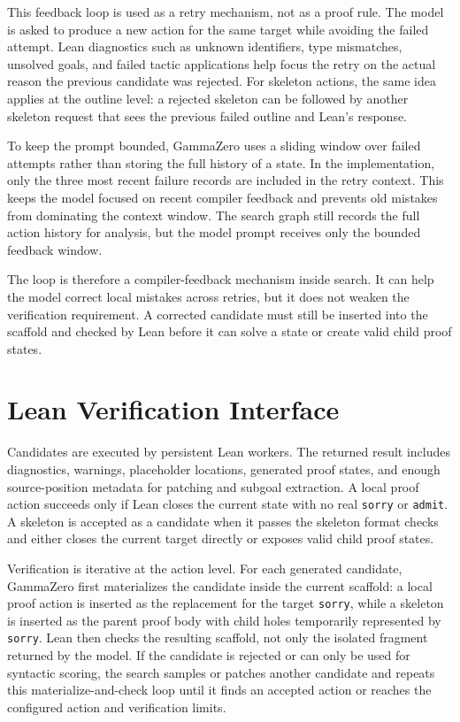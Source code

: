 This feedback loop is used as a retry mechanism, not as a proof rule. The model is asked to produce a
new action for the same target while avoiding the failed attempt. Lean diagnostics such as unknown
identifiers, type mismatches, unsolved goals, and failed tactic applications help focus the retry on the
actual reason the previous candidate was rejected. For skeleton actions, the same idea applies at the
outline level: a rejected skeleton can be followed by another skeleton request that sees the previous
failed outline and Lean's response.

To keep the prompt bounded, GammaZero uses a sliding window over failed attempts rather than storing
the full history of a state. In the implementation, only the three most recent failure records are included
in the retry context. This keeps the model focused on recent compiler feedback and prevents old
mistakes from dominating the context window. The search graph still records the full action history for
analysis, but the model prompt receives only the bounded feedback window.

The loop is therefore a compiler-feedback mechanism inside search. It can help the model correct local
mistakes across retries, but it does not weaken the verification requirement. A corrected candidate must
still be inserted into the scaffold and checked by Lean before it can solve a state or create valid child
proof states.

\section{Lean Verification Interface}

Candidates are executed by persistent Lean workers. The returned result includes diagnostics, warnings, placeholder locations, generated proof states, and enough source-position metadata for patching and subgoal extraction. A local proof action succeeds only if Lean closes the current state with no real \texttt{sorry} or \texttt{admit}. A skeleton is accepted as a candidate when it passes the skeleton format checks and either closes the current target directly or exposes valid child proof states.

Verification is iterative at the action level. For each generated candidate, GammaZero first materializes the candidate inside the current scaffold: a local proof action is inserted as the replacement for the target \texttt{sorry}, while a skeleton is inserted as the parent proof body with child holes temporarily represented by \texttt{sorry}. Lean then checks the resulting scaffold, not only the isolated fragment returned by the model. If the candidate is rejected or can only be used for syntactic scoring, the search samples or patches another candidate and repeats this materialize-and-check loop until it finds an accepted action or reaches the configured action and verification limits.

